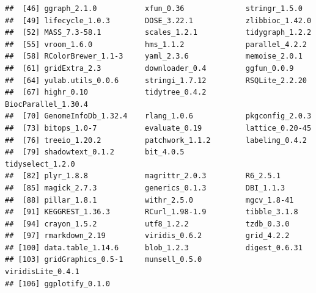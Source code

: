 \documentclass[
]{article}
\begin{document}
\begin{verbatim}
##  [46] ggraph_2.1.0           xfun_0.36              stringr_1.5.0         
##  [49] lifecycle_1.0.3        DOSE_3.22.1            zlibbioc_1.42.0       
##  [52] MASS_7.3-58.1          scales_1.2.1           tidygraph_1.2.2       
##  [55] vroom_1.6.0            hms_1.1.2              parallel_4.2.2        
##  [58] RColorBrewer_1.1-3     yaml_2.3.6             memoise_2.0.1         
##  [61] gridExtra_2.3          downloader_0.4         ggfun_0.0.9           
##  [64] yulab.utils_0.0.6      stringi_1.7.12         RSQLite_2.2.20        
##  [67] highr_0.10             tidytree_0.4.2         BiocParallel_1.30.4   
##  [70] GenomeInfoDb_1.32.4    rlang_1.0.6            pkgconfig_2.0.3       
##  [73] bitops_1.0-7           evaluate_0.19          lattice_0.20-45       
##  [76] treeio_1.20.2          patchwork_1.1.2        labeling_0.4.2        
##  [79] shadowtext_0.1.2       bit_4.0.5              tidyselect_1.2.0      
##  [82] plyr_1.8.8             magrittr_2.0.3         R6_2.5.1              
##  [85] magick_2.7.3           generics_0.1.3         DBI_1.1.3             
##  [88] pillar_1.8.1           withr_2.5.0            mgcv_1.8-41           
##  [91] KEGGREST_1.36.3        RCurl_1.98-1.9         tibble_3.1.8          
##  [94] crayon_1.5.2           utf8_1.2.2             tzdb_0.3.0            
##  [97] rmarkdown_2.19         viridis_0.6.2          grid_4.2.2            
## [100] data.table_1.14.6      blob_1.2.3             digest_0.6.31         
## [103] gridGraphics_0.5-1     munsell_0.5.0          viridisLite_0.4.1     
## [106] ggplotify_0.1.0
\end{verbatim}
\end{document}
